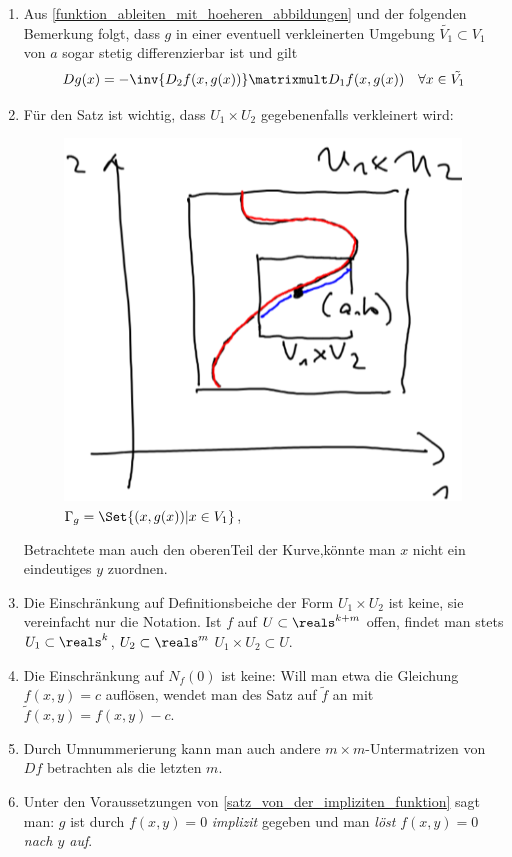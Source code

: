 \begin{bemerkungen*}
  \begin{enumerate}
    \item \label{implizite_funktion_auf_umgebung_stetig_differenzierbar} Aus \ref{funktion_ableiten_mit_hoeheren_abbildungen} und der folgenden Bemerkung folgt, dass \( g \) in einer eventuell verkleinerten Umgebung \( \tilde{V_1}\subset V_1 \) von \( a \) sogar stetig differenzierbar ist und gilt
    \begin{equation*}
      Dg(x)=-\inv{D_2 f(x,g(x))}\matrixmult D_1f(x,g(x))\quad \forall x\in \tilde{V_1}
    \end{equation*}
    \item Für den Satz ist wichtig, dass \( U_1\times U_2 \) gegebenenfalls verkleinert wird:
    \begin{figure}[H]
      \centering
      \includegraphics[width=0.5\linewidth]{figures/verkleinerter_definitionsbereich_implizite_funktion}
      \caption*{\textcolor{Blue}{\( \Gamma_g=\Set{(x,g(x))|x\in V_1} \)},\textcolor{Red}{}}
      \label{fig:verkleinerter_definitionsbereich_implizite_funktion}
    \end{figure}
    Betrachtete man auch den oberenTeil der Kurve,könnte man \( x \) nicht ein eindeutiges \( y \) zuordnen.
    \item Die Einschränkung auf Definitionsbeiche der Form \( U_1\times U_2  \) ist keine, sie vereinfacht nur die Notation. Ist \( f \) auf \( U\subset \reals^{k+m} \) offen, findet man stets \( U_1\subset \reals^k \), \( U_2\subset \reals^m \) \sd \( U_1\times U_2\subset U \).
    \item Die Einschränkung auf \( N_f(0) \) ist keine: Will man etwa die Gleichung \( f(x,y)=c \) auflösen, wendet man des Satz auf \( \tilde{f} \) an mit \( \tilde{f}(x,y)=f(x,y)-c \).
    \item Durch Umnummerierung kann man auch andere \( m\times m \)-Untermatrizen von \( Df \) betrachten als die letzten \( m \).
    \item Unter den Voraussetzungen von \ref{satz_von_der_impliziten_funktion} sagt man: \( g \) ist durch \( f(x,y)=0 \) \emph{implizit} gegeben und man \emph{löst} \( f(x,y)=0 \) \emph{nach \( y \) auf}.
  \end{enumerate}
\end{bemerkungen*}
